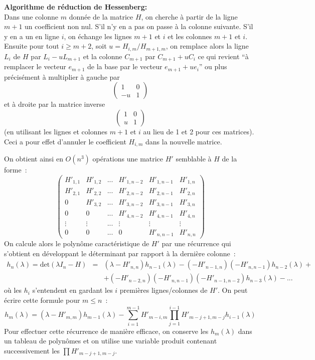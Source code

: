 \documentclass[a4paper,11pt]{book}
\begin{document}
\begin{giacjshere}
{\bf Algorithme de réduction de Hessenberg:}\\
Dans une colonne $m$ donnée de la matrice $H$, 
on cherche à partir de la ligne
$m+1$ un coefficient non nul. S'il n'y en a pas on passe à la colonne
suivante. S'il y en a un en ligne $i$, on échange les lignes $m+1$
et $i$ et les colonnes $m+1$ et $i$. Ensuite pour tout $i\geq m+2$,
soit $u=H_{i,m}/H_{m+1,m}$, on remplace alors la ligne $L_i$ de $H$
par $L_i-uL_{m+1}$ et la colonne $C_{m+1}$ par $C_{m+1}+uC_i$
ce qui revient ``à remplacer le vecteur $e_{m+1}$ de la base
par le vecteur $e_{m+1}+ue_i$'' ou plus pr\'ecis\'ement
\`a multiplier \`a gauche par 
$$\left(\begin{array}{cc}
1 & 0 \\ -u & 1\end{array}\right)$$ 
et \`a droite par la matrice inverse
$$\left(\begin{array}{cc}
1 & 0 \\ u & 1\end{array}\right)$$ 
(en utilisant les lignes et colonnes
$m+1$ et $i$ au lieu de 1 et 2 pour ces matrices). 
Ceci a pour effet d'annuler le coefficient $H_{i,m}$
dans la nouvelle matrice.

On obtient ainsi en $O(n^3)$ opérations
une matrice $H'$ semblable à $H$ de la forme~:
\[
\left(\begin{array}{cccccc}
H'_{1,1} & H'_{1,2} & ... & H'_{1,n-2} & H'_{1,n-1} & H'_{1,n}\\
H'_{2,1} & H'_{2,2} & ... & H'_{2,n-2} & H'_{2,n-1} & H'_{2,n} \\
0       & H'_{3,2} & ... & H'_{3,n-2} & H'_{3,n-1} & H'_{3,n} \\
0       & 0       & ... & H'_{4,n-2} & H'_{4,n-1} & H'_{4,n} \\
\vdots  & \vdots  & ... & \vdots & \vdots  &  \vdots \\
0       & 0       & ... & 0 & H'_{n,n-1} & H'_{n,n}
\end{array} \right)
\]
On calcule alors le polynôme caractéristique de $H'$ par une récurrence
qui s'obtient en développant le déterminant par rapport à la derni\`ere
colonne~:
\begin{eqnarray*}
 h_n(\lambda) = \mbox{det}(\lambda I_n-H)&=& 
(\lambda-H'_{n,n}) h_{n-1}(\lambda) -(-H'_{n-1,n}) (-H'_{n,n-1}) 
h_{n-2}(\lambda) + \\
& & 
    + (-H'_{n-2,n}) (-H'_{n,n-1}) (-H'_{n-1,n-2}) h_{n-3}(\lambda) - ...
\end{eqnarray*}
où les $h_i$ s'entendent en gardant les $i$ premières lignes/colonnes de $H'$.
On peut \'ecrire cette formule pour $m\leq n$~:
\[ h_m(\lambda)= (\lambda - H'_{m,m}) h_{m-1}(\lambda)
-\sum_{i=1}^{m-1} H'_{m-i,m} \prod_{j=1}^{i-1} H'_{m-j+1,m-j} h_{i-1}(\lambda)\]
Pour effectuer cette r\'ecurrence de mani\`ere efficace, on conserve
les $h_m(\lambda)$ dans un tableau de polyn\^omes et on utilise une 
variable produit contenant successivement les $\prod H'_{m-j+1,m-j}$.


\end{giacjshere}
\end{document}
